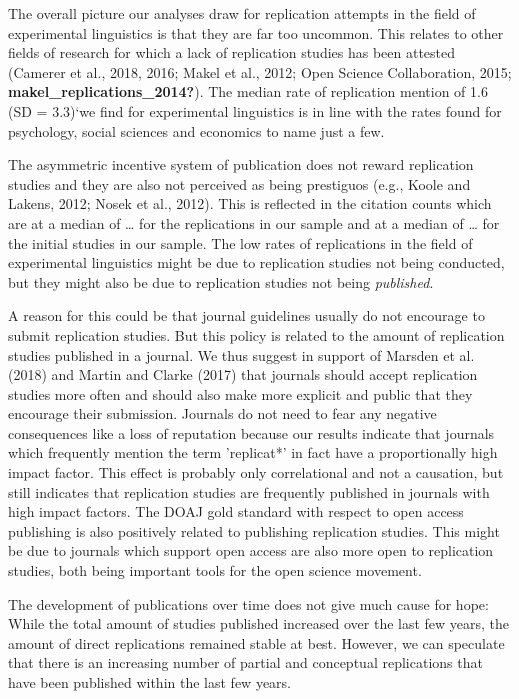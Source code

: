 \documentclass[]{elsarticle} %
\begin{document}
The overall picture our analyses draw for replication attempts in the
field of experimental linguistics is that they are far too uncommon.
This relates to other fields of research for which a lack of replication
studies has been attested (Camerer et al., 2018, 2016; Makel et al.,
2012; Open Science Collaboration, 2015;
\textbf{makel\_replications\_2014?}). The median rate of replication
mention of 1.6 (SD = 3.3)`we find for experimental linguistics is in
line with the rates found for psychology, social sciences and economics
to name just a few.

The asymmetric incentive system of publication does not reward
replication studies and they are also not perceived as being prestiguos
(e.g., Koole and Lakens, 2012; Nosek et al., 2012). This is reflected in
the citation counts which are at a median of \ldots{} for the
replications in our sample and at a median of \ldots{} for the initial
studies in our sample. The low rates of replications in the field of
experimental linguistics might be due to replication studies not being
conducted, but they might also be due to replication studies not being
\emph{published}.

A reason for this could be that journal guidelines usually do not
encourage to submit replication studies. But this policy is related to
the amount of replication studies published in a journal. We thus
suggest in support of Marsden et al. (2018) and Martin and Clarke (2017)
that journals should accept replication studies more often and should
also make more explicit and public that they encourage their submission.
Journals do not need to fear any negative consequences like a loss of
reputation because our results indicate that journals which frequently
mention the term 'replicat*' in fact have a proportionally high impact
factor. This effect is probably only correlational and not a causation,
but still indicates that replication studies are frequently published in
journals with high impact factors. The DOAJ gold standard with respect
to open access publishing is also positively related to publishing
replication studies. This might be due to journals which support open
access are also more open to replication studies, both being important
tools for the open science movement.

The development of publications over time does not give much cause for
hope: While the total amount of studies published increased over the
last few years, the amount of direct replications remained stable at
best. However, we can speculate that there is an increasing number of
partial and conceptual replications that have been published within the
last few years.
\end{document}
